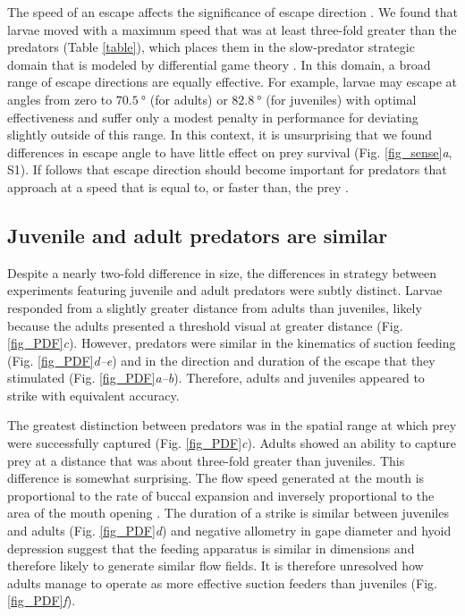 \documentclass[]{rsos}%
\begin{document}
The speed of an escape affects the significance of escape direction  \cite{Isaacs:1965uz,Weihs:1984tb}.
We found that larvae moved with a maximum speed that was at least three-fold greater than the predators (Table \ref{table}), which places them in the slow-predator strategic domain that is modeled by differential game theory \cite{Soto:2015cj}.
In this domain, a broad range of escape directions are equally effective.
For example, larvae may escape at angles from zero to $\SI{70.5}{\degree}$ (for adults) or $\SI{82.8}{\degree}$ (for juveniles) with optimal effectiveness \cite{Soto:2015cj} and suffer only a modest penalty in performance for deviating slightly outside of this range. 
In this context, it is unsurprising that we found differences in escape angle to have little effect on prey survival (Fig. \ref{fig_sense}\textit{a}, S1).
If follows that escape direction should become important for predators that approach at a speed that is equal to, or faster than, the prey \cite{Soto:2015cj}. 

\subsection{Juvenile and adult predators are similar} 

Despite a nearly two-fold difference in size, the differences in strategy between experiments featuring juvenile and adult predators were subtly distinct.
Larvae responded from a slightly greater distance from adults than juveniles, likely because the adults presented a threshold visual at greater distance (Fig. \ref{fig_PDF}\textit{c}).
However, predators were similar in the kinematics of suction feeding (Fig. \ref{fig_PDF}\textit{d--e}) and in the direction and duration of the escape that they stimulated (Fig. \ref{fig_PDF}\textit{a--b}).
Therefore, adults and juveniles appeared to strike with equivalent accuracy.

The greatest distinction between predators was in the spatial range at which prey were successfully captured (Fig. \ref{fig_PDF}\textit{c}).
Adults showed an ability to capture prey at a distance that was about three-fold greater than juveniles.
This difference is somewhat surprising. 
The flow speed generated at the mouth is proportional to the rate of buccal expansion and inversely proportional to the area of the mouth opening \cite{Holzman:2008jc,Muller:1982p335}.
The duration of a strike is similar between juveniles and adults (Fig. \ref{fig_PDF}\textit{d}) and negative allometry in gape diameter and hyoid depression \cite{Hernandez:2000uma} suggest that the feeding apparatus is similar in dimensions and therefore likely to generate similar flow fields.
It is therefore unresolved how adults manage to operate as more effective suction feeders than juveniles (Fig. \ref{fig_PDF}\textit{f}).
\end{document}
